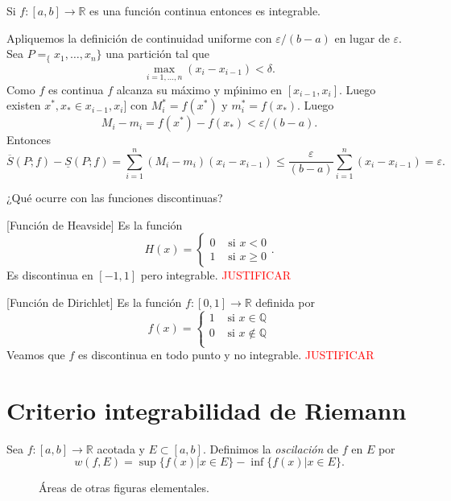 \begin{teorema}{}  Si $f:[a,b]\to\mathbb{R}$ es una función continua entonces es integrable.
\end{teorema}
\begin{demo}  Apliquemos la definición de continuidad uniforme con $\varepsilon/(b-a)$ en lugar de $\varepsilon$. Sea $P=_\{x_1,\ldots,x_n\}$ una partición tal que
\[
 \max_{i=1,\ldots,n}(x_i-x_{i-1})<\delta.
\]
Como $f$ es continua $f$ alcanza su máximo y mṕinimo en $[x_{i-1},x_i]$. Luego existen $x^*,x_*\in x_{i-1},x_i]$ con $M_i^*=f(x^*)$ y $m_i^*=f(x_*)$.  Luego
\[
 M_i-m_i=f(x^*)-f(x_*)<\varepsilon/(b-a).
 \]
Entonces 
\[
 \overline{S}(P;f)-\underline{S}(P;f)=\sum_{i=1}^n(M_i-m_i)(x_i-x_{i-1})\leq \frac{\varepsilon}{(b-a)}\sum_{i=1}^n (x_i-x_{i-1})=\varepsilon.
\]


 \end{demo}

 
¿Qué ocurre con las funciones discontinuas? 

\begin{ejemplo}{}[Función de Heavside] Es la función
\[
 H(x)=\begin{cases}0 & \text{ si } x<0\\1 & \text{ si } x\geq 0\end{cases}.
\]
Es discontinua en $[-1,1]$ pero integrable.  \textcolor{red}{JUSTIFICAR}
 
\end{ejemplo}



\begin{ejemplo}{}[Función de Dirichlet] Es la función $f:[0,1]\to\mathbb{R}$ definida por 
\[
 f(x)=\begin{cases} 1 & \text{ si } x\in\mathbb{Q}\\0 & \text{ si }   x\notin\mathbb{Q}\\
\end{cases}
\]
Veamos que $f$ es discontinua en todo punto y no integrable. \textcolor{red}{JUSTIFICAR}
\end{ejemplo}


 \section{Criterio integrabilidad de Riemann}
 
\begin{definicion}[Oscilación]{} Sea $f:[a,b]\to\mathbb{R}$ acotada y $E\subset [a,b]$. Definimos la \emph{oscilación} de $f$ en $E$ por 
\[
 w(f,E)=\sup\{f(x)| x\in E\}-\inf\{f(x)| x\in E\}.
\]
\end{definicion}
\begin{figure}[h]
 \begin{center}

 \end{center}
 \caption{Áreas de otras figuras elementales.}\label{fig:paral-trig}
\end{figure}


